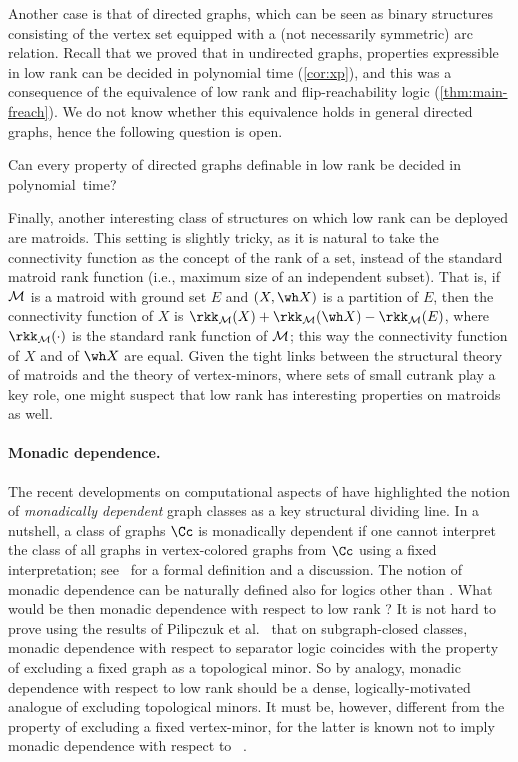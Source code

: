 Another case is that of directed graphs, which can be seen as binary structures consisting of the vertex set equipped with a (not necessarily symmetric) arc relation. Recall that we proved that in undirected graphs, properties expressible in low rank \mso can be decided in polynomial time (\cref{cor:xp}), and this was a consequence of the equivalence of low rank \mso and flip-reachability logic (\cref{thm:main-freach}). We do not know whether this equivalence holds in general directed graphs, hence the following question is open.

\begin{question}
 Can every property of directed graphs definable in low rank \mso be decided in polynomial~time?
\end{question}

Finally, another interesting class of structures on which low rank \mso can be deployed are matroids. This setting is slightly tricky, as it is natural to take the connectivity function as the concept of the rank of a set, instead of the standard matroid rank function (i.e., maximum size of an independent subset). That is, if $\cal M$ is a matroid with ground set $E$ and $(X,\wh X)$ is a partition of $E$, then the connectivity function of $X$ is $\rkk_{\cal M}(X)+\rkk_{\cal M}(\wh X)-\rkk_{\cal M}(E)$, where $\rkk_{\cal M}(\cdot)$ is the standard rank function of $\cal M$; this way the connectivity function of $X$ and of $\wh X$ are equal. Given the tight links between the structural theory of matroids and the theory of vertex-minors, where sets of small cutrank play a key role, one might suspect that low rank \mso has interesting properties on matroids as well.

\paragraph*{Monadic dependence.} The recent developments on computational aspects of \fo have highlighted the notion of {\em{monadically dependent}} graph classes as a key structural dividing line. In a nutshell, a class of graphs $\Cc$ is monadically dependent if one cannot interpret the class of all graphs in vertex-colored graphs from $\Cc$ using a fixed \fo interpretation; see~\cite[Section 4.1]{Pilipczuk25} for a formal definition and a discussion. The notion of monadic dependence can be naturally defined also for logics other than \fo. What would be then monadic dependence with respect to low rank \mso? It is not hard to prove using the results of Pilipczuk et al.~\cite{separatorModelChecking} that on subgraph-closed classes, monadic dependence with respect to separator logic coincides with the property of excluding a fixed graph as a topological minor. So by analogy, monadic dependence with respect to low rank \mso should be a dense, logically-motivated analogue of excluding topological minors. It must be, however, different from the property of excluding a fixed vertex-minor, for the latter is known not to imply monadic dependence with respect to \fo~\cite{HlinenyP22}.

